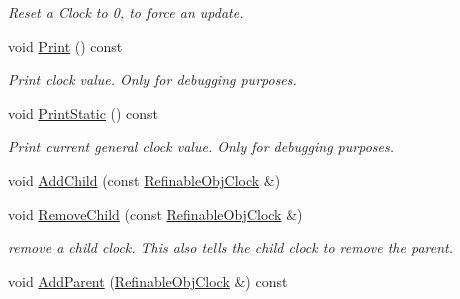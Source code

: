 \begin{DoxyCompactItemize}
\begin{DoxyCompactList}\small\item\em Reset a Clock to 0, to force an update. \end{DoxyCompactList}\item 
\mbox{\label{class_obj_cryst_1_1_refinable_obj_clock_a0e29f2111fc9f64caed2e8d6df5b267f}} 
void \mbox{\hyperlink{class_obj_cryst_1_1_refinable_obj_clock_a0e29f2111fc9f64caed2e8d6df5b267f}{Print}} () const
\begin{DoxyCompactList}\small\item\em Print clock value. Only for debugging purposes. \end{DoxyCompactList}\item 
\mbox{\label{class_obj_cryst_1_1_refinable_obj_clock_aa8595ed96bca55e70fdded6e72c0a9f8}} 
void \mbox{\hyperlink{class_obj_cryst_1_1_refinable_obj_clock_aa8595ed96bca55e70fdded6e72c0a9f8}{Print\+Static}} () const
\begin{DoxyCompactList}\small\item\em Print current general clock value. Only for debugging purposes. \end{DoxyCompactList}\item 
void \mbox{\hyperlink{class_obj_cryst_1_1_refinable_obj_clock_a4be5b7b2f802d67000098a89939ffaf1}{Add\+Child}} (const \mbox{\hyperlink{class_obj_cryst_1_1_refinable_obj_clock}{Refinable\+Obj\+Clock}} \&)
\item 
\mbox{\label{class_obj_cryst_1_1_refinable_obj_clock_a7aff0bea53eea6500afa4ff153deb8ca}} 
void \mbox{\hyperlink{class_obj_cryst_1_1_refinable_obj_clock_a7aff0bea53eea6500afa4ff153deb8ca}{Remove\+Child}} (const \mbox{\hyperlink{class_obj_cryst_1_1_refinable_obj_clock}{Refinable\+Obj\+Clock}} \&)
\begin{DoxyCompactList}\small\item\em remove a child clock. This also tells the child clock to remove the parent. \end{DoxyCompactList}\item 
void \mbox{\hyperlink{class_obj_cryst_1_1_refinable_obj_clock_a56dadfe83111cdbc37da80cc19185e9a}{Add\+Parent}} (\mbox{\hyperlink{class_obj_cryst_1_1_refinable_obj_clock}{Refinable\+Obj\+Clock}} \&) const
\item 

\end{DoxyCompactItemize}
